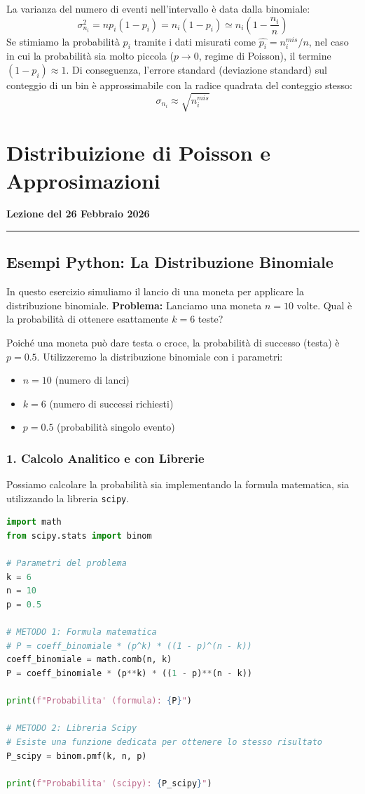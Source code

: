 \documentclass[openany,a4paper,12pt]{book}
\theoremstyle{remark}
\newcommand{\thelezione}{}
\newcommand{\lezione}[2]{
\newpage
\renewcommand{\thelezione}{#2} 
\section{#1} 
\noindent\textbf{\color{RoyalBlue}Lezione del #2}\par\vspace{0.5em}\hrule\vspace{1em}
}
\begin{document}
La varianza del numero di eventi nell'intervallo è data dalla binomiale:
\[ \sigma_{n_i}^2 = n p_i (1 - p_i) = n_i (1 - p_i) \simeq n_i \left(1 - \frac{n_i}{n}\right) \]
Se stimiamo la probabilità $p_i$ tramite i dati misurati come $\hat{p_i} = n_i^{mis}/n$, nel caso in cui la probabilità sia molto piccola ($p \to 0$, regime di Poisson), il termine $(1-p_i) \approx 1$.
Di conseguenza, l'errore standard (deviazione standard) sul conteggio di un bin è approssimabile con la radice quadrata del conteggio stesso:
\[ \sigma_{n_i} \approx \sqrt{n_i^{mis}} \]

\lezione{Distribuizione di Poisson e Approsimazioni}{26 Febbraio 2026}

\subsection*{Esempi Python: La Distribuzione Binomiale}

In questo esercizio simuliamo il lancio di una moneta per applicare la distribuzione binomiale.
\textbf{Problema:} Lanciamo una moneta $n=10$ volte. Qual è la probabilità di ottenere esattamente $k=6$ teste?

Poiché una moneta può dare testa o croce, la probabilità di successo (testa) è $p=0.5$. Utilizzeremo la distribuzione binomiale con i parametri:
\begin{itemize}
    \item $n = 10$ (numero di lanci)
    \item $k = 6$ (numero di successi richiesti)
    \item $p = 0.5$ (probabilità singolo evento)
\end{itemize}

\subsubsection*{1. Calcolo Analitico e con Librerie}
Possiamo calcolare la probabilità sia implementando la formula matematica, sia utilizzando la libreria \texttt{scipy}.

\begin{lstlisting}[language=Python, frame=single, caption=Calcolo probabilità Binomiale]
import math
from scipy.stats import binom

# Parametri del problema
k = 6
n = 10
p = 0.5

# METODO 1: Formula matematica
# P = coeff_binomiale * (p^k) * ((1 - p)^(n - k))
coeff_binomiale = math.comb(n, k)
P = coeff_binomiale * (p**k) * ((1 - p)**(n - k))

print(f"Probabilita' (formula): {P}")

# METODO 2: Libreria Scipy
# Esiste una funzione dedicata per ottenere lo stesso risultato
P_scipy = binom.pmf(k, n, p)

print(f"Probabilita' (scipy): {P_scipy}")
\end{lstlisting}
\end{document}
